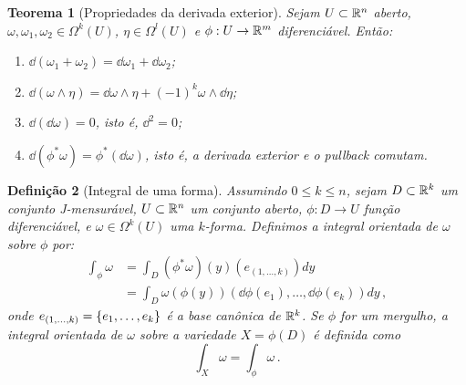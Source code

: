 \documentclass[a4paper,12pt]{extreport}
\newtheorem{mydef}{Definição}
\newtheorem{myteo}[mydef]{Teorema}
\newif\ifspacesbetweentheos
\newcommand{\theospace}[1]{
\ifspacesbetweentheos
  \vspace{#1}
\fi
}
\newcommand{\theonewpage}{
\ifspacesbetweentheos
  \newpage
\fi
}
\begin{document}
\begin{myteo}[Propriedades da derivada exterior]
  Sejam $U \subset \mathbb{R}^n$ aberto,
  $\omega, \omega_1, \omega_2 \in \Omega^k(U)$,
  $\eta \in \Omega^l(U)$
  e $\phi:U \to \mathbb{R}^m$ diferenciável.
  Então:
  \begin{enumerate}[label=\alph*)]
  \item $\dd(\omega_1 + \omega_2) = \dd{\omega_1} + \dd{\omega_2}$;
  \item $\dd(\omega \wedge \eta)
    = \dd{\omega} \wedge \eta + (-1)^k \omega \wedge \dd{\eta}$;
  \item $\dd(\dd{\omega}) = 0$, isto é, $\dd^2 = 0$;
  \item $\dd(\phi^* \omega) = \phi^*(\dd{\omega})$, isto é,
    a derivada exterior e o pullback comutam.
  \end{enumerate}
\end{myteo}


\theonewpage


\begin{mydef}[Integral de uma forma]
  Assumindo $0 \le k \le n$,
  sejam $D \subset \mathbb{R}^k$ um conjunto J-mensurável,
  $U \subset \mathbb{R}^n$ um conjunto aberto,
  $\phi : D \to U$ função diferenciável,
  e $\omega \in \Omega^k(U)$ uma $k$-forma.
  Definimos a \emph{integral orientada} de $\omega$
  sobre $\phi$ por:
  \begin{equation}
    \begin{split}
      \int_\phi \omega &= \int_D(\phi^* \omega) (y)
                         (e_{(1,\dots,k)}) dy \\
                       &= \int_D \omega(\phi(y))
                         (\dd \phi(e_1), \dots, \dd \phi(e_k)) dy\,,
    \end{split}
  \end{equation}
  onde $e_{(1,\dots,k)} = \qty{e_1, \dots, e_k}$ é a base canônica de
  $\mathbb{R}^k$.
  Se $\phi$ for um mergulho,
  a integral orientada de $\omega$
  sobre a variedade $X = \phi(D)$ é definida como
  \begin{equation}
    \int_X \omega = \int_\phi \omega \,.
  \end{equation}
  

\end{mydef}


\theospace{4cm}
\end{document}

